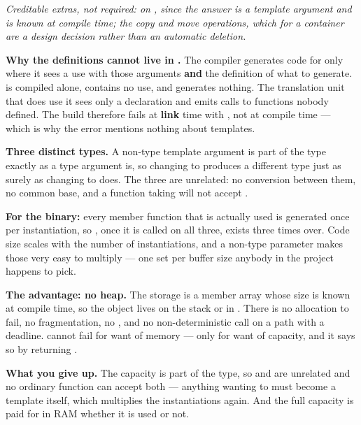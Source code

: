 \medskip
{\itshape Creditable extras, not required:  on , since the answer
is a template argument and is known at compile time; the copy and move operations, which for a
container are a design decision rather than an automatic deletion.\par}

\textbf{Why the definitions cannot live in .} The compiler generates code for
 only where it sees a use with those arguments \textbf{and} the
definition of what to generate.  is compiled alone, contains no use, and generates
nothing. The translation unit that does use it sees only a declaration and emits calls to functions
nobody defined. The build therefore fails at \textbf{link} time with , not
at compile time --- which is why the error mentions nothing about templates. 

\textbf{Three distinct types.} A non-type template argument is part of the type exactly as a type
argument is, so changing  to  produces a different type just as surely as
changing  to  does. The three are unrelated: no conversion
between them, no common base, and a function taking  will not accept
. 

\textbf{For the binary:} every member function that is actually used is generated once per
instantiation, so , once it is called on all three, exists three times over. Code size
scales with the number of instantiations, and a non-type parameter makes those very easy to multiply
--- one set per buffer size anybody in the project happens to pick. 

\textbf{The advantage: no heap.} The storage is a member array whose size is known at compile time,
so the object lives on the stack or in . There is no allocation to fail, no
fragmentation, no , and no non-deterministic call on a path with a deadline.
 cannot fail for want of memory --- only for want of capacity, and it says so by
returning . 

\textbf{What you give up.} The capacity is part of the type, so  and
 are unrelated and no ordinary function can accept both --- anything wanting to
must become a template itself, which multiplies the instantiations again. And the full capacity is
paid for in RAM whether it is used or not. 

